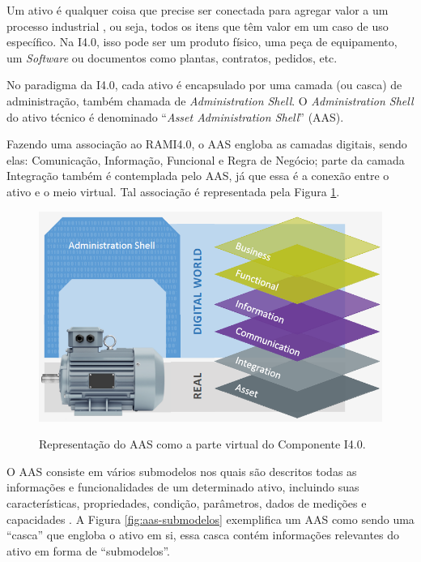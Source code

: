 \documentclass[
	12pt,				%
	oneside,			%
	a4paper,			%
	english,			%
	brazil				%
]{abntex2}
\begin{document}
	Um ativo é qualquer coisa que precise ser conectada para agregar valor a um processo industrial \cite{zvei2019aas}, ou seja, todos os itens que têm valor em um caso de uso específico. Na I4.0, isso pode ser um produto físico, uma peça de equipamento, um \textit{Software} ou documentos como plantas, contratos, pedidos, etc.
	
	No paradigma da I4.0, cada ativo é encapsulado por uma camada (ou casca) de administração, também chamada de \textit{Administration Shell}. O \textit{Administration Shell} do ativo técnico é denominado ``\textit{Asset Administration Shell}'' (AAS).
	
	Fazendo uma associação ao RAMI4.0, o AAS engloba as camadas digitais, sendo elas: Comunicação, Informação, Funcional e Regra de Negócio; parte da camada Integração também é contemplada pelo AAS, já que essa é a conexão entre o ativo e o meio virtual. Tal associação é representada pela Figura \ref{fig:aas-rami}.

	\begin{figure}[H]
		\centering
		\caption{Representação do AAS como a parte virtual do Componente I4.0.}
		\includegraphics[width=1\textwidth]{aas-rami.png}
		\label{fig:aas-rami}
	\end{figure}
		
	O AAS consiste em vários submodelos nos quais são descritos todas as informações e funcionalidades de um determinado ativo, incluindo suas características, propriedades, condição, parâmetros, dados de medições e capacidades \cite{bader2019aas}. A Figura \ref{fig:aas-submodelos} exemplifica um AAS como sendo uma ``casca'' que engloba o ativo em si, essa casca contém informações relevantes do ativo em forma de ``submodelos''.
	
\end{document}
